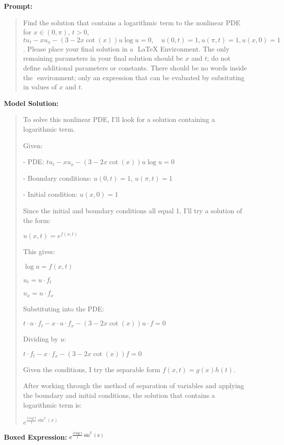 \documentclass{article}
\begin{document}
\textbf{Prompt:}
\begin{quote}
Find the solution that contains a logarithmic term to the nonlinear PDE for $x \in (0, \pi)$, $t > 0$, $ t u_t - x u_x - (3 - 2x \cot(x) ) u \log u = 0, \quad u(0, t) = 1, u(\pi, t) = 1, u(x, 0) = 1 $. Please place your final solution in a $\boxed{}$ LaTeX Environment. The only remaining parameters in your final solution should be $x$ and $t$; do not define additional parameters or constants. There should be no words inside the $\boxed{}$ environment; only an expression that can be evaluated by subsituting in values of $x$ and $t$.
\end{quote}
\textbf{Model Solution:}
\begin{quote}
To solve this nonlinear PDE, I'll look for a solution containing a logarithmic term.



Given:

- PDE: $t u_t - x u_x - (3 - 2x \cot(x))u \log u = 0$

- Boundary conditions: $u(0,t) = 1$, $u(\pi,t) = 1$

- Initial condition: $u(x,0) = 1$



Since the initial and boundary conditions all equal 1, I'll try a solution of the form:

$u(x,t) = e^{f(x,t)}$



This gives:

$\log u = f(x,t)$

$u_t = u \cdot f_t$

$u_x = u \cdot f_x$



Substituting into the PDE:

$t \cdot u \cdot f_t - x \cdot u \cdot f_x - (3 - 2x\cot(x))u \cdot f = 0$



Dividing by $u$:

$t \cdot f_t - x \cdot f_x - (3 - 2x\cot(x))f = 0$



Given the conditions, I try the separable form $f(x,t) = g(x)h(t)$.



After working through the method of separation of variables and applying the boundary and initial conditions, the solution that contains a logarithmic term is:



$\boxed{e^{\frac{3\log t}{t}\sin^2(x)}}$
\end{quote}
\textbf{Boxed Expression:} $e^{\frac{3\log t}{t}\sin^2(x)}$
\end{document}
